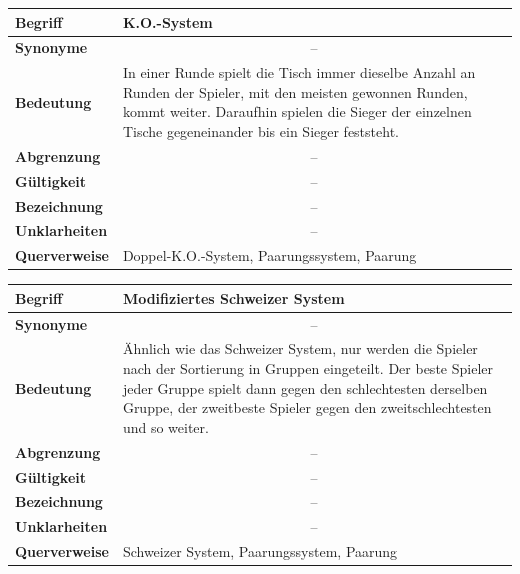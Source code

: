 \documentclass[11pt]{article}
\begin{document}
\begin{tabularx}{\textwidth}{| p{} | p{} |}
	\hline
	\textbf{Begriff} & K.O.-System\\ 
	\hline
	\textbf{Synonyme} & \multicolumn{1}{c|}{--}\\
	\hline 
	\textbf{Bedeutung} & In einer Runde spielt die Tisch immer dieselbe Anzahl an Runden der Spieler, mit den meisten gewonnen Runden, kommt weiter. Daraufhin spielen die Sieger der einzelnen Tische gegeneinander bis ein Sieger feststeht.\\
	\hline
	\textbf{Abgrenzung} & \multicolumn{1}{c|}{--}\\
	\hline
	\textbf{Gültigkeit} & \multicolumn{1}{c|}{--}\\
	\hline
	\textbf{Bezeichnung} & \multicolumn{1}{c|}{--}\\
	\hline
	\textbf{Unklarheiten} & \multicolumn{1}{c|}{--} \\
	\hline
	\textbf{Querverweise} & Doppel-K.O.-System, Paarungssystem, Paarung\\
	\hline
\end{tabularx}

\newpage

\begin{tabularx}{\textwidth}{| p{} | p{} |}
	\hline
	\textbf{Begriff} & Modifiziertes Schweizer System\\ 
	\hline
	\textbf{Synonyme} & \multicolumn{1}{c|}{--}\\
	\hline 
	\textbf{Bedeutung} & Ähnlich wie das Schweizer System, nur werden die Spieler nach der Sortierung in Gruppen eingeteilt. Der beste Spieler jeder Gruppe spielt dann gegen den schlechtesten derselben Gruppe, der zweitbeste Spieler gegen den zweitschlechtesten und so weiter.\\
	\hline
	\textbf{Abgrenzung} & \multicolumn{1}{c|}{--}\\
	\hline
	\textbf{Gültigkeit} & \multicolumn{1}{c|}{--}\\
	\hline
	\textbf{Bezeichnung} & \multicolumn{1}{c|}{--}\\
	\hline
	\textbf{Unklarheiten} & \multicolumn{1}{c|}{--} \\
	\hline
	\textbf{Querverweise} & Schweizer System, Paarungssystem, Paarung\\
	\hline
\end{tabularx}
	
\end{document}
